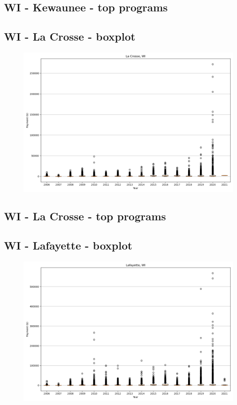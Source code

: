 \subsection*{WI - Kewaunee - top programs}

\newpage
\subsection*{WI - La Crosse - boxplot}
\begin{figure}[h]
\centering
\includegraphics[width=7in]{../output/boxplots/counties/La Crosse-WI_boxplot.png}
\end{figure}


\subsection*{WI - La Crosse - top programs}

\newpage
\subsection*{WI - Lafayette - boxplot}
\begin{figure}[h]
\centering
\includegraphics[width=7in]{../output/boxplots/counties/Lafayette-WI_boxplot.png}
\end{figure}


